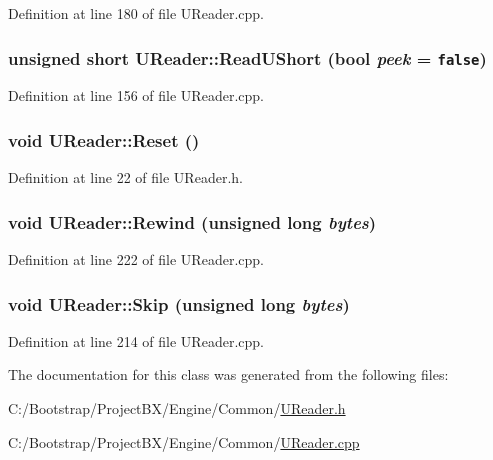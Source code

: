 Definition at line 180 of file UReader.cpp.\hypertarget{class_u_reader_f160454289c788bd8513882f4145399a}{
\subsubsection[{ReadUShort}]{\setlength{\rightskip}{0pt plus 5cm}unsigned short UReader::ReadUShort (bool {\em peek} = {\tt false})}}
\label{class_u_reader_f160454289c788bd8513882f4145399a}




Definition at line 156 of file UReader.cpp.\hypertarget{class_u_reader_25734116166238d18d24089fa2356fe2}{
\subsubsection[{Reset}]{\setlength{\rightskip}{0pt plus 5cm}void UReader::Reset ()}}
\label{class_u_reader_25734116166238d18d24089fa2356fe2}




Definition at line 22 of file UReader.h.\hypertarget{class_u_reader_d166b7fd9de8aa1139a221e0287764f5}{
\subsubsection[{Rewind}]{\setlength{\rightskip}{0pt plus 5cm}void UReader::Rewind (unsigned long {\em bytes})}}
\label{class_u_reader_d166b7fd9de8aa1139a221e0287764f5}




Definition at line 222 of file UReader.cpp.\hypertarget{class_u_reader_cf514eed848a10b68ad83adc6e6abf37}{
\subsubsection[{Skip}]{\setlength{\rightskip}{0pt plus 5cm}void UReader::Skip (unsigned long {\em bytes})}}
\label{class_u_reader_cf514eed848a10b68ad83adc6e6abf37}




Definition at line 214 of file UReader.cpp.

The documentation for this class was generated from the following files:\begin{CompactItemize}
\item 
C:/Bootstrap/ProjectBX/Engine/Common/\hyperlink{_u_reader_8h}{UReader.h}\item 
C:/Bootstrap/ProjectBX/Engine/Common/\hyperlink{_u_reader_8cpp}{UReader.cpp}\end{CompactItemize}
